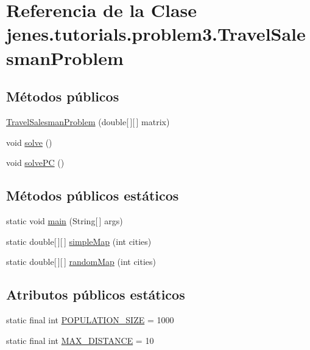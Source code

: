 \hypertarget{classjenes_1_1tutorials_1_1problem3_1_1_travel_salesman_problem}{\section{Referencia de la Clase jenes.\-tutorials.\-problem3.\-Travel\-Salesman\-Problem}
\label{classjenes_1_1tutorials_1_1problem3_1_1_travel_salesman_problem}
}
\subsection*{Métodos públicos}
\begin{DoxyCompactItemize}
\item 
\hyperlink{classjenes_1_1tutorials_1_1problem3_1_1_travel_salesman_problem_a6a5b57b4c96b1cd6367be99ff5542b0d}{Travel\-Salesman\-Problem} (double\mbox{[}$\,$\mbox{]}\mbox{[}$\,$\mbox{]} matrix)
\item 
void \hyperlink{classjenes_1_1tutorials_1_1problem3_1_1_travel_salesman_problem_ac2507cd4e4fecd4a68fa76dee8ee40e1}{solve} ()
\item 
void \hyperlink{classjenes_1_1tutorials_1_1problem3_1_1_travel_salesman_problem_a6f115876612aecf1c22058ebc96f21d8}{solve\-P\-C} ()
\end{DoxyCompactItemize}
\subsection*{Métodos públicos estáticos}
\begin{DoxyCompactItemize}
\item 
static void \hyperlink{classjenes_1_1tutorials_1_1problem3_1_1_travel_salesman_problem_a2ca005fbeba6c5fdf1406aed8ebd6b56}{main} (String\mbox{[}$\,$\mbox{]} args)
\item 
static double\mbox{[}$\,$\mbox{]}\mbox{[}$\,$\mbox{]} \hyperlink{classjenes_1_1tutorials_1_1problem3_1_1_travel_salesman_problem_a5101bfe709c445cb0dacc93024979082}{simple\-Map} (int cities)
\item 
static double\mbox{[}$\,$\mbox{]}\mbox{[}$\,$\mbox{]} \hyperlink{classjenes_1_1tutorials_1_1problem3_1_1_travel_salesman_problem_aaac8cbd0414b02891c9572b3e07c2637}{random\-Map} (int cities)
\end{DoxyCompactItemize}
\subsection*{Atributos públicos estáticos}
\begin{DoxyCompactItemize}
\item 
static final int \hyperlink{classjenes_1_1tutorials_1_1problem3_1_1_travel_salesman_problem_afda171e13788bcb67f73fd82bd89498b}{P\-O\-P\-U\-L\-A\-T\-I\-O\-N\-\_\-\-S\-I\-Z\-E} = 1000
\item 
static final int \hyperlink{classjenes_1_1tutorials_1_1problem3_1_1_travel_salesman_problem_a94747a5d97d1f3974d74a27e641285c8}{M\-A\-X\-\_\-\-D\-I\-S\-T\-A\-N\-C\-E} = 10
\end{DoxyCompactItemize}


